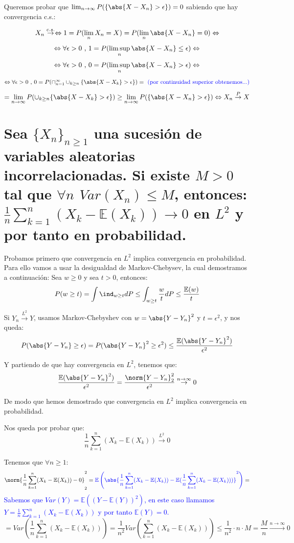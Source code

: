 \documentclass{apuntes}
\begin{document}
Queremos probar que $ \lim_{n \rightarrow \infty} P(\{\abs{X-X_n} > \epsilon\})=0$ sabiendo que hay convergencia c.s.:

\[
X_n \stackrel{c.s.}{\rightarrow} \Leftrightarrow 1=P(\lim_n X_n = X) = P(\lim_n \abs{X-X_n}=0)\Leftrightarrow
\]
\[
\Leftrightarrow \forall \epsilon >0 \text{ , } 1=P(\limsup_n \abs{X-X_n} \leq \epsilon) \Leftrightarrow
\]
\[
\Leftrightarrow \forall \epsilon >0 \text{ , } 0=P(\limsup_n \abs{X-X_n} > \epsilon) \Leftrightarrow
\]
\[
\Leftrightarrow \forall \epsilon >0 \text{ , } 0=P(\cap_{n=1}^{\infty} \cup_{k \geq n} \{\abs{X-X_k} > \epsilon\}) = \text{ \textcolor{blue}{(por continuidad superior obtenemos...)}}
\]
\[
= \lim_{n \rightarrow
\infty} P( \cup_{k \geq n} \{\abs{X-X_k} > \epsilon\}) \geq \lim_{n \rightarrow \infty} P(\{\abs{X-X_n} > \epsilon\})  \Leftrightarrow X_n \stackrel{P}{\rightarrow} X
\]


\section{Sea $\{X_n\}_{n\geq 1}$ una sucesión de variables aleatorias incorrelacionadas. Si existe $M>0$ tal que $\forall n$ $Var(X_n)\leq M$, entonces: $\frac{1}{n}\sum_{k=1}^{n}(X_k -\mathbb{E}(X_k)) \rightarrow 0$ en $L^2$ y por tanto en probabilidad.}

Probamos primero que convergencia en $L^2$ implica convergencia en probabilidad. Para ello vamos a usar la desigualdad de Markov-Chebysev, la cual demostramos a continuación: Sea $w \geq 0$ y sea $t>0$, entonces:
\[
P(w \geq t)=\int \ind_{w\geq t} dP \leq \int_{w  \geq t} \frac{w}{t} dP \leq \frac{\mathbb{E}(w)}{t}
\]

Si $Y_n \stackrel{L^2}{\rightarrow} Y$, usamos Markov-Chebyshev con $w=\abs{Y-Y_n}^2$ y $t=\epsilon^2$, y nos queda:
\[
P(\abs{Y-Y_n}\geq \epsilon)=P(\abs{Y-Y_n}^2 \geq \epsilon^2) \leq \frac{\mathbb{E}(\abs{Y-Y_n}^2)}{\epsilon^2}
\]

Y partiendo de que hay convergencia en $L^2$, tenemos que:
\[
\frac{\mathbb{E}(\abs{Y-Y_n}^2)}{\epsilon^2} = \frac{\norm{Y-Y_n}_2^2}{\epsilon^2} \stackrel{n \rightarrow \infty}{\rightarrow} 0
\]

De modo que hemos demostrado que convergencia en $L^2$ implica convergencia en probabilidad.

Nos queda por probar que:
\[
\frac{1}{n}\sum_{k=1}^{n}(X_k -\mathbb{E}(X_k)) \stackrel{L^2}{\rightarrow} 0
\]

Tenemos que $\forall n \geq 1$:
\[
\norm{\frac{1}{n}\sum_{k=1}^{n}(X_k -\mathbb{E}(X_k)) -0}_2^2 = \textcolor{blue}{\mathbb{E}\left(\abs{\frac{1}{n}\sum_{k=1}^{n}(X_k -\mathbb{E}(X_k))-\mathbb{E}(\frac{1}{n}\sum_{k=1}^{n}(X_k -\mathbb{E}(X_k)))}^2\right)}=
\]
\textcolor{blue}{Sabemos que $Var(Y)= \mathbb{E}((Y-\mathbb{E}(Y))^2)$, en este caso llamamos $Y = \frac{1}{n}\sum_{k=1}^{n}(X_k -\mathbb{E}(X_k))$ y por tanto $\mathbb{E}(Y)=0$.}
\[
= Var\left(\frac{1}{n}\sum_{k=1}^{n}(X_k -\mathbb{E}(X_k))\right) = \frac{1}{n^2}Var\left(\sum_{k=1}^{n}(X_k -\mathbb{E}(X_k))\right) \leq \frac{1}{n^2}\cdot n\cdot M = \frac{M}{n} \stackrel{n \rightarrow \infty}{\rightarrow} 0
\]
\end{document}
